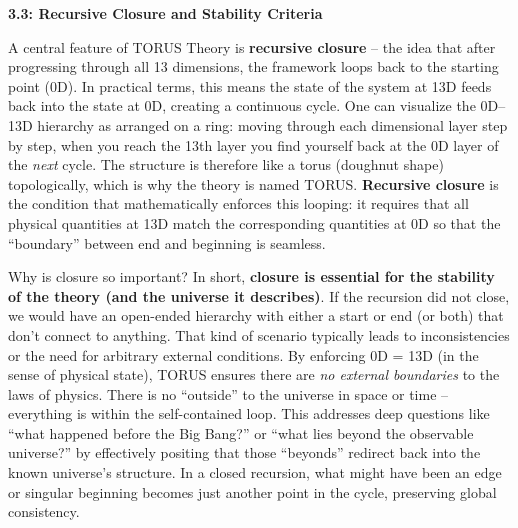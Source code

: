 \textbf{3.3: Recursive Closure and Stability Criteria}

A central feature of TORUS Theory is \textbf{recursive closure} -- the
idea that after progressing through all 13 dimensions, the framework
loops back to the starting point (0D). In practical terms, this means
the state of the system at 13D feeds back into the state at 0D, creating
a continuous cycle. One can visualize the 0D--13D hierarchy as arranged
on a ring: moving through each dimensional layer step by step, when you
reach the 13th layer you find yourself back at the 0D layer of the
\emph{next} cycle. The structure is therefore like a torus (doughnut
shape) topologically, which is why the theory is named TORUS.
\textbf{Recursive closure} is the condition that mathematically enforces
this looping: it requires that all physical quantities at 13D match the
corresponding quantities at 0D so that the ``boundary'' between end and
beginning is seamless​.

Why is closure so important? In short, \textbf{closure is essential for
the stability of the theory (and the universe it describes)}. If the
recursion did not close, we would have an open-ended hierarchy with
either a start or end (or both) that don't connect to anything. That
kind of scenario typically leads to inconsistencies or the need for
arbitrary external conditions. By enforcing 0D = 13D (in the sense of
physical state), TORUS ensures there are \emph{no external boundaries}
to the laws of physics. There is no ``outside'' to the universe in space
or time -- everything is within the self-contained loop. This addresses
deep questions like ``what happened before the Big Bang?'' or ``what
lies beyond the observable universe?'' by effectively positing that
those ``beyonds'' redirect back into the known universe's structure​. In
a closed recursion, what might have been an edge or singular beginning
becomes just another point in the cycle, preserving global consistency.

